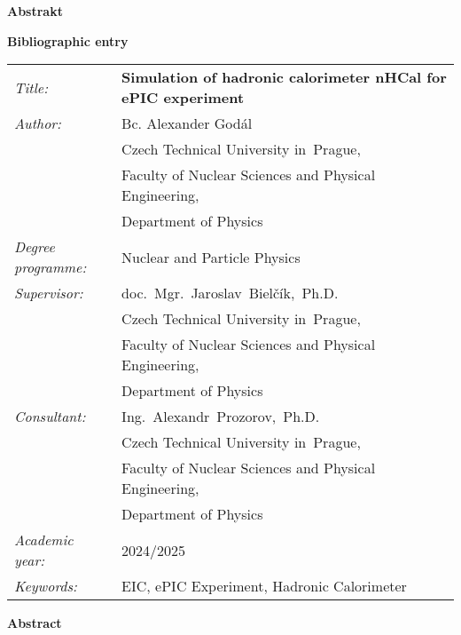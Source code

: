 \documentclass[a4paper, 12pt, oneside]{book}
\newcommand{\cvuten}{Czech Technical University in~Prague}
\newcommand{\fjfien}{Faculty of Nuclear Sciences and Physical Engineering}
\newcommand{\kfen}{Department of Physics}
\newcommand{\oboren}{Nuclear and Particle Physics}
\newcommand{\abstraktcz}{}
\newcommand{\nazeven}{Simulation of hadronic calorimeter nHCal for ePIC experiment} %
\newcommand{\klicovaslovaen}{EIC, ePIC Experiment, Hadronic Calorimeter}
\newcommand{\abstrakten}{}
\newcommand{\autor}{Bc. Alexander Godál}
\newcommand{\vedouci}{doc.~Mgr.~Jaroslav~Bielčík,~Ph.D.}
\newcommand{\konzultant}{Ing.~Alexandr~Prozorov,~Ph.D.}
\newcommand{\akrok}{2024/2025}
\begin{document}
\vspace{10mm}

{\bf Abstrakt}
\vspace{5mm}\\
\indent \abstraktcz





\newpage
\thispagestyle{empty}

{\bf Bibliographic entry}

\vspace{5mm} 

\begin{tabular}{p{100pt}l}
  {\em Title:} & {\bf \footnotesize\nazeven} \\
  {\em Author:} & \autor \\
   &\cvuten, \\   
   &\fjfien,\\
   &\kfen\\ 
  {\em Degree programme:} & \oboren\\ 
  {\em Supervisor:} & \vedouci \\ 
   &\cvuten, \\   
   &\fjfien,\\
   &\kfen\\ 
  {\em Consultant:} & \konzultant \\ 
   &\cvuten, \\   
   &\fjfien,\\
   &\kfen\\ 
  {\em Academic year:} & \akrok\\
  {\em Keywords:} & \klicovaslovaen\\

\end{tabular}

\vspace{10mm}

{\bf Abstract}
\vspace{5mm}\\
\indent \abstrakten







\tableofcontents






% 



%
\end{document}
